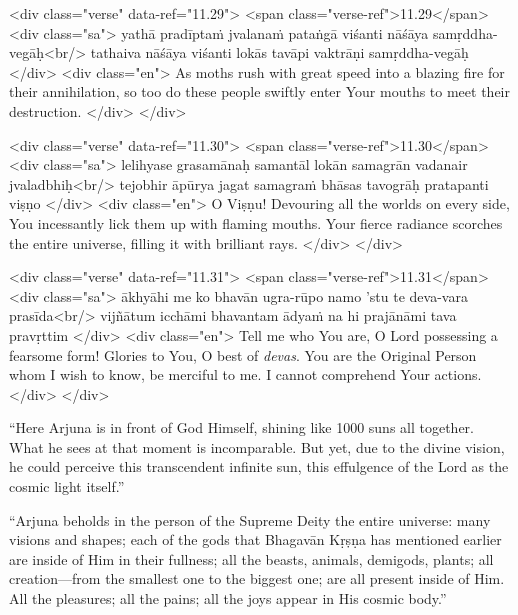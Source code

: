 \begin{html}
<div class="verse" data-ref="11.29">
  <span class="verse-ref">11.29</span>
  <div class="sa">
    yathā pradīptaṁ jvalanaṁ pataṅgā viśanti nāśāya samṛddha-vegāḥ<br/>
    tathaiva nāśāya viśanti lokās tavāpi vaktrāṇi samṛddha-vegāḥ
  </div>
  <div class="en">
    As moths rush with great speed into a blazing fire for their annihilation, so too do these people swiftly enter Your mouths to meet their destruction.
  </div>
</div>
\end{html}



\begin{html}
<div class="verse" data-ref="11.30">
  <span class="verse-ref">11.30</span>
  <div class="sa">
    lelihyase grasamānaḥ samantāl lokān samagrān vadanair jvaladbhiḥ<br/>
    tejobhir āpūrya jagat samagraṁ bhāsas tavogrāḥ pratapanti viṣṇo
  </div>
  <div class="en">
    O Viṣṇu! Devouring all the worlds on every side, You incessantly lick them up with flaming mouths. Your fierce radiance scorches the entire universe, filling it with brilliant rays.
  </div>
</div>
\end{html}



\begin{html}
<div class="verse" data-ref="11.31">
  <span class="verse-ref">11.31</span>
  <div class="sa">
    ākhyāhi me ko bhavān ugra-rūpo namo ’stu te deva-vara prasīda<br/>
    vijñātum icchāmi bhavantam ādyaṁ na hi prajānāmi tava pravṛttim
  </div>
  <div class="en">
    Tell me who You are, O Lord possessing a fearsome form! Glories to You, O best of \textit{devas}. You are the Original Person whom I wish to know, be merciful to me. I cannot comprehend Your actions.
  </div>
</div>
\end{html}


\enquote{Here Arjuna is in front of God Himself, shining like 1000 suns all together. What he sees at that moment is incomparable. But yet, due to the divine vision, he could perceive this transcendent infinite sun, this effulgence of the Lord as the cosmic light itself.}

\enquote{Arjuna beholds in the person of the Supreme Deity the entire universe: many visions and shapes; each of the gods that Bhagavān Kṛṣṇa has mentioned earlier are inside of Him in their fullness; all the beasts, animals, demigods, plants; all creation---from the smallest one to the biggest one; are all present inside of Him. All the pleasures; all the pains; all the joys appear in His cosmic body.}

